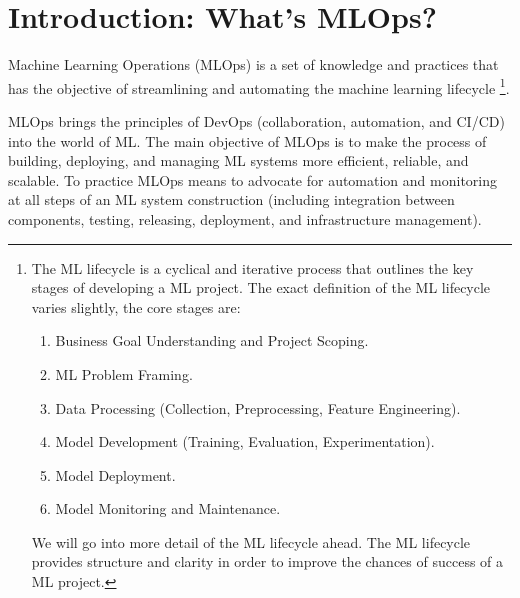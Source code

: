 \section{Introduction: What's MLOps?}
\noindent
Machine Learning Operations (MLOps) is a set of knowledge and practices that has
the objective of streamlining and automating the machine learning lifecycle
\footnote{
    The ML lifecycle is a cyclical and iterative process that outlines the
    key stages of developing a ML project. The exact definition of the ML
    lifecycle varies slightly, the core stages are:
    \begin{enumerate}
        \item Business Goal Understanding and Project Scoping.
        
        \item ML Problem Framing.
        
        \item Data Processing
        (Collection, Preprocessing, Feature Engineering).

        \item Model Development
        (Training, Evaluation, Experimentation).

        \item Model Deployment.
        
        \item Model Monitoring and Maintenance.
    \end{enumerate}
    

    We will go into more detail of the ML lifecycle ahead.
    The ML lifecycle provides structure and clarity in order to improve the
    chances of success of a ML project.
}.


MLOps brings the principles of DevOps (collaboration, automation, and CI/CD)
into the world of ML. The main objective of MLOps is to make the process of 
building, deploying, and managing ML systems more efficient, reliable, and
scalable. To practice MLOps means to advocate for automation and monitoring
at all steps of an ML system construction (including integration between
components, testing, releasing, deployment, and infrastructure management).



